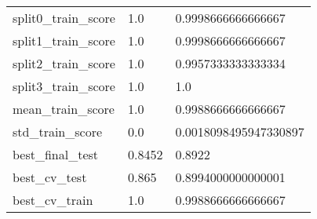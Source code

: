 \begin{tabular}{lll}
split0\_train\_score &                                                1.0 &                                 0.9998666666666667 \\
split1\_train\_score &                                                1.0 &                                 0.9998666666666667 \\
split2\_train\_score &                                                1.0 &                                 0.9957333333333334 \\
split3\_train\_score &                                                1.0 &                                                1.0 \\
mean\_train\_score   &                                                1.0 &                                 0.9988666666666667 \\
std\_train\_score    &                                                0.0 &                              0.0018098495947330897 \\
best\_final\_test    &                                             0.8452 &                                             0.8922 \\
best\_cv\_test       &                                              0.865 &                                 0.8994000000000001 \\
best\_cv\_train      &                                                1.0 &                                 0.9988666666666667 \\
\bottomrule
\end{tabular}
